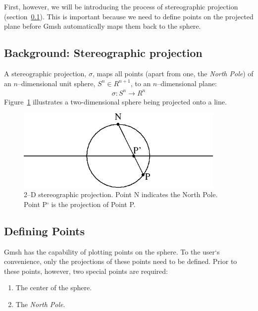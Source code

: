 First, however, we will be introducing the process of stereographic projection (section~\ref{sect:stereoprojection}). This is important because we need to define points on the projected plane before Gmsh automatically maps them back to the sphere.

\subsection{Background: Stereographic projection}
\label{sect:stereoprojection}
A stereographic projection, $\sigma$, maps all points (apart from one, the \emph{North Pole}) of an $n$--dimensional unit sphere, $S^n \in  R^{n+1}$, to an $n$--dimensional plane:
\begin{align}
\sigma : S^n \rightarrow R^n
\end{align}
Figure~\ref{fig:2dstereoprojection} illustrates a two-dimensional sphere being projected onto a line.

\begin{figure}[htbp]
 \centering
  \includegraphics[width=0.9\textwidth]{../figures/2dstereoprojection}
  \caption{2--D stereographic projection. Point N indicates the North Pole. Point P` is the projection of Point P.}
  \label{fig:2dstereoprojection}
\end{figure}


\subsection{Defining Points}
\label{sect:definepointsmanifold}
Gmsh has the capability of plotting points on the sphere. To the user`s convenience, only the projections of these points need to be defined. Prior to these points, however, two special points are required:
\begin{enumerate}
  \item The center of the sphere.
  \item The \emph{North Pole}.
\end{enumerate}

